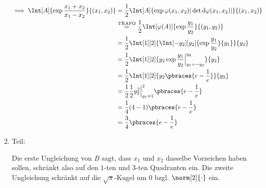 \begin{solution}
\begin{enumerate}[label = \arabic*.]
    \begin{align*}
        \implies
        \Int[A]
        {
            \exp \frac{x_1 + x_2}{x_1 - x_2}
        }{(x_1, x_2)}
        & =
        \frac{1}{2}
        \Int[A]
        {
            \exp \varphi(x_1, x_2)
            |\det \mathrm{d} \varphi(x_1, x_2)|
            }{(x_1, x_2)} \\
        & \stackrel
        {
            \text{TRAFO}
        }{=}
        \frac{1}{2}
        \Int[\varphi(A)]
        {
            \exp \frac{y_1}{y_2}
        }{(y_1, y_2)} \\
        & =
        \frac{1}{2}
        \Int[1][2]
        {
            \Int[-y_2][y_2]
            {
                \exp \frac{y_1}{y_2}
            }{y_1}
        }{y_2} \\
        & =
        \frac{1}{2}
        \Int[1][2]
        {
            y_2 \exp \frac{y_1}{y_2} \Big |_{y_1 = -y_2}^{y_2}
        }{y_2} \\
        & =
        \frac{1}{2}
        \Int[1][2]
        {
            y_2 \pbraces{e - \frac{1}{e}}
        }{y_2} \\
        & =
        \frac{1}{2}
        \frac{1}{2}
        y_2^2 \Big |_{y_1 = 1}^2
        \pbraces{e - \frac{1}{e}} \\
        & =
        \frac{1}{4}
        (4 - 1)
        \pbraces{e - \frac{1}{e}} \\
        & =
        \frac{3}{4}
        \pbraces{e - \frac{1}{e}}
    \end{align*}

    \item Teil:
    
    Die erste Ungleichung von $B$ sagt, dass $x_1$ und $x_2$ dasselbe Vorzeichen haben sollen, schränkt also auf den $1$-ten und $3$-ten Quadranten ein.
    Die zweite Ungleichung schränkt auf die $\sqrt \pi$-Kugel um $0$ bzgl. $\norm[2]{\cdot}$ ein.

    \begin{center}
\end{center}
\end{enumerate}
\end{solution}
